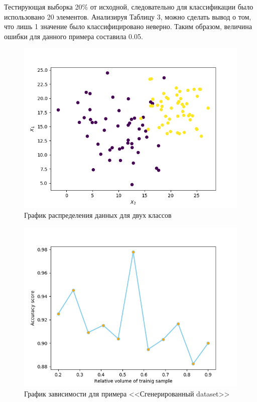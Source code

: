 \documentclass[]{article}
\numberwithin{equation}{section}
\begin{document}
        Тестирующая выборка 20\% от исходной, следовательно для классификации было использовано 20 элементов. Анализируя Таблицу 3, можно сделать вывод о том, что лишь 1 значение было классифицировано неверно. Таким образом, величина ошибки для данного примера составила 0.05.

        \begin{figure}[H]
            \centering
            \includegraphics[width = 1.0\linewidth]{data/generated.png}
            \caption{График распределения данных для двух классов}
        \end{figure}

        \begin{figure}[H]
            \centering
            \includegraphics[width = 1.0\linewidth]{data/generated_precision.png}
            \caption{График зависимости для примера <<Сгенерированный dataset>>}
        \end{figure}
\end{document}
